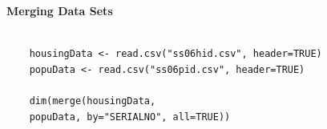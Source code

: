 \documentclass{beamer}
\begin{document}
\begin{frame}[fragile]
	
%	
\textbf{Merging Data Sets}
\begin{framed} 
	\begin{verbatim}

	housingData <- read.csv("ss06hid.csv", header=TRUE)
	popuData <- read.csv("ss06pid.csv", header=TRUE)
	
	dim(merge(housingData, 
	popuData, by="SERIALNO", all=TRUE))
	\end{verbatim}
\end{framed} 

\end{frame}
\end{document}
